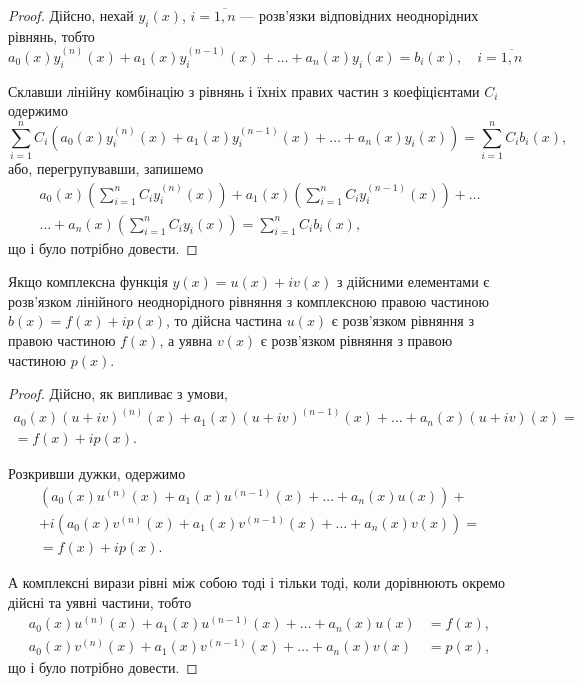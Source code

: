 \begin{proof}
	Дійсно, нехай $y_i(x)$, $i = \overline{1, n}$ --- розв'язки відповідних неоднорідних рівнянь, тобто
	\begin{equation*}
		a_0(x) y_i^{(n)}(x) + a_1(x) y_i^{(n - 1)}(x) + \ldots + a_n(x) y_i(x) = b_i(x), \quad i = \overline{1, n}
	\end{equation*}

	Склавши лінійну комбінацію з рівнянь і їхніх правих частин з коефіцієнтами $C_i$ одержимо
	\begin{equation*}
		\sum_{i = 1}^n C_i \left( a_0(x) y_i^{(n)}(x) + a_1(x) y_i^{(n - 1)}(x) + \ldots + a_n(x) y_i(x) \right) = \sum_{i = 1}^n C_i b_i(x),
	\end{equation*}
	або, перегрупувавши, запишемо
	\begin{multline*}
		a_0(x) \left( \sum_{i = 1}^n C_i y_i^{(n)}(x) \right) + a_1(x) \left( \sum_{i = 1}^n C_i y_i^{(n - 1)}(x)\right) + \ldots \\ \ldots + a_n(x) \left( \sum_{i = 1}^n C_i y_i(x) \right) = \sum_{i = 1}^n C_i b_i(x),
	\end{multline*}
	що і було потрібно довести.
\end{proof}

\begin{property}
	Якщо комплексна функція $y(x) = u(x) + i v(x)$ з дійсними елементами є розв'язком лінійного неоднорідного рівняння з комплексною правою частиною $b(x) = f(x) + i p(x)$, то дійсна частина $u(x)$ є розв'язком рівняння з правою частиною $f(x)$, а уявна $v(x)$ є розв'язком рівняння з правою частиною $p(x)$.
\end{property}

\begin{proof}
	Дійсно, як випливає з умови,
	\begin{multline*}
	 	a_0(x) (u + i v)^{(n)}(x) + a_1(x) (u + i v)^{(n - 1)}(x) + \ldots + a_n(x) (u + i v)(x) = \\ = f(x) + i p(x).
	\end{multline*}
	
	Розкривши дужки, одержимо
	\begin{multline*}
		\left( a_0(x) u^{(n)}(x) + a_1(x) u^{(n - 1)}(x) + \ldots + a_n(x) u(x) \right) + \\ + i \left( a_0(x) v^{(n)}(x) + a_1(x) v^{(n - 1)}(x) + \ldots + a_n(x) v(x) \right) = \\ = f(x) + i p(x).
	\end{multline*}

	А комплексні вирази рівні між собою тоді і тільки тоді, коли дорівнюють окремо дійсні та уявні частини, тобто
	\begin{align*}
		a_0(x) u^{(n)}(x) + a_1(x) u^{(n - 1)}(x) + \ldots + a_n(x) u(x) &= f(x), \\ 
		a_0(x) v^{(n)}(x) + a_1(x) v^{(n - 1)}(x) + \ldots + a_n(x) v(x) &= p(x),
	\end{align*}
	що і було потрібно довести.
\end{proof}

